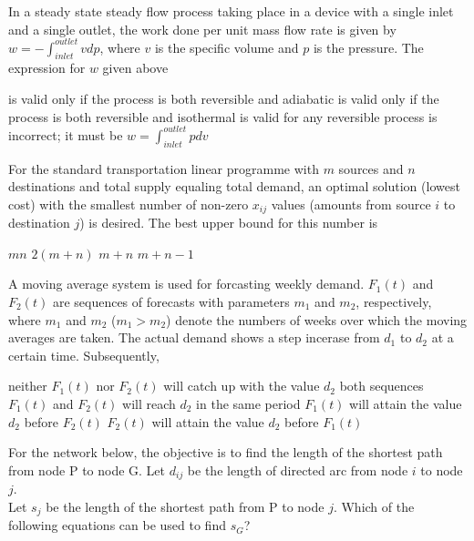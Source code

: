 \documentclass[addpoints,11pt]{exam}
\begin{document}
\begin{questions}
        \question In a steady state steady flow process taking place in a device with a single inlet and a single outlet, the work done per unit mass flow rate is given by $w=-\int_{inlet}^{outlet} vdp$, where $v$ is the specific volume and $p$ is the pressure. The expression for $w$ given above

        \begin{choices}
            \choice is valid only if the process is both reversible and adiabatic
            \choice is valid only if the process is both reversible and isothermal
            \choice is valid for any reversible process
            \choice is incorrect; it must be $w=\int_{inlet}^{outlet} pdv$
        \end{choices}

        \question For the standard transportation linear programme with $m$ sources and $n$ destinations and total supply equaling total demand, an optimal solution (lowest cost) with the smallest number of non-zero $x_{ij}$ values (amounts from source $i$ to destination $j$) is desired. The best upper bound for this number is

        \begin{oneparchoices}
            \choice $mn$
            \choice $2(m+n)$
            \choice $m+n$
            \choice $m+n-1$
        \end{oneparchoices}

        \question A moving average system is used for forcasting weekly demand. $F_1(t)$ and $F_2(t)$ are sequences of forecasts with parameters $m_1$ and $m_2$, respectively, where $m_1$ and $m_2$ ($m_1>m_2$) denote the numbers of weeks over which the moving averages are taken. The actual demand shows a step incerase from $d_1$ to $d_2$ at a certain time. Subsequently,

    \begin{choices}
        \choice neither $F_1(t)$ nor $F_2(t)$ will catch up with the value $d_2$
        \choice both sequences $F_1(t)$ and $F_2(t)$ will reach $d_2$ in the same period
        \choice $F_1(t)$ will attain the value $d_2$ before $F_2(t)$
        \choice $F_2(t)$ will attain the value $d_2$ before $F_1(t)$
    \end{choices}

    \question For the network below, the objective is to find the length of the shortest path from node P to node G. Let $d_{ij}$ be the length of directed arc from node $i$ to node $j$.%
    \\Let $s_j$ be the length of the shortest path from P to node $j$. Which of the following equations can be used to find $s_G$?


\end{questions}
\end{document}
